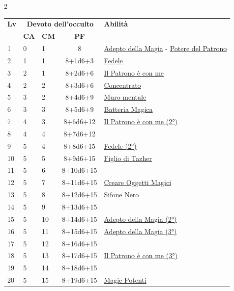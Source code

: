 {\begin{multicols}{2}


\noindent\begin{tabularx}{\linewidth}{p{0.55cm}|p{0.55cm}p{0.55cm}c|X|}
	\toprule
 \rowcolor{gray!20}	\textbf{Lv} & \multicolumn{3}{c|}{\textbf{Devoto dell'occulto}} & \textbf{Abilità} \\
& \centering\arraybackslash \textbf{CA} & \centering\arraybackslash \textbf{CM} & \centering\arraybackslash \textbf{PF} & \\
	\toprule
	1 & 0 & 1 & 8 & \hyperlink{Adepto della Magia}{Adepto della Magia} - \hyperlink{Potere del Patrono}{Potere del Patrono}\\
	\rowcolor{gray!20}2 & 1 & 1 & 8+1d6+3 & \hyperlink{Fedele}{Fedele}\\
	3 & 2 & 1 & 8+2d6+6 & \hyperlink{Il Patrono è con me}{Il Patrono è con me}\\
	\rowcolor{gray!20}4 & 2 & 2 & 8+3d6+6 & \hyperlink{Concentrato}{Concentrato}\\
	5 & 3 & 2 & 8+4d6+9 & \hyperlink{Muro mentale}{Muro mentale}\\
	\rowcolor{gray!20}6 & 3 & 3 & 8+5d6+9 & \hyperlink{Batteria Magica}{Batteria Magica}\\
	7 & 4 & 3 & 8+6d6+12 & \hyperlink{Il Patrono è con me}{Il Patrono è con me (2°)}\\
	\rowcolor{gray!20}8 & 4 & 4 & 8+7d6+12 & \\
	9 & 5 & 4 & 8+8d6+15 & \hyperlink{Fedele}{Fedele (2°)}\\
	\rowcolor{gray!20}10 & 5 & 5 & 8+9d6+15 & \hyperlink{Figlio di Tazher}{Figlio di Tazher}\\
	11 & 5 & 6 & 8+10d6+15 & \\
	\rowcolor{gray!20}12 & 5 & 7 & 8+11d6+15 & \hyperlink{Creare Oggetti Magici}{Creare Oggetti Magici}\\
	13 & 5 & 8 & 8+12d6+15 & \hyperlink{Sifone Nero}{Sifone Nero}\\
	\rowcolor{gray!20}14 & 5 & 9 & 8+13d6+15 & \\
	15 & 5 & 10 & 8+14d6+15 & \hyperlink{Adepto della Magia}{Adepto della Magia (2°)}\\
	\rowcolor{gray!20}16 & 5 & 11 & 8+15d6+15 & \hyperlink{Adepto della Magia}{Adepto della Magia (3°)}\\
	17 & 5 & 12 & 8+16d6+15 & \\
	\rowcolor{gray!20}18 & 5 & 13 & 8+17d6+15 & \hyperlink{Il Patrono è con me}{Il Patrono è con me (3°)}\\
	19 & 5 & 14 & 8+18d6+15 & \\
	\rowcolor{gray!20}20 & 5 & 15 & 8+19d6+15 & \hyperlink{Magie Potenti}{Magie Potenti}\\
\end{tabularx}



\end{multicols}}
